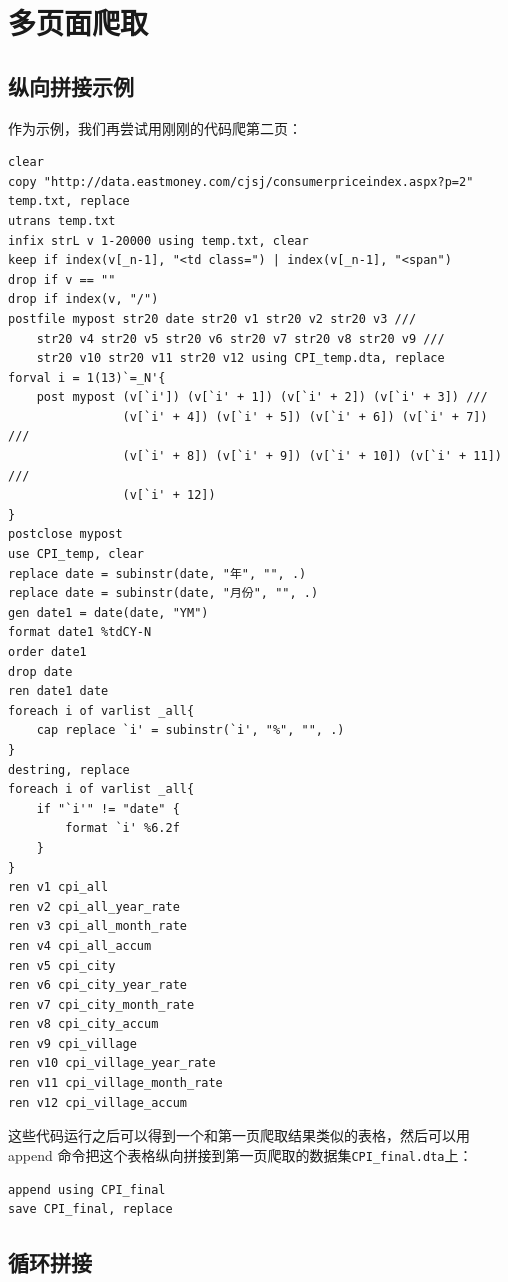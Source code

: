 \documentclass[cn,fancy,blue,11pt]{elegantbook}
\begin{document}
\hypertarget{section-36}{%
\section{多页面爬取}\label{section-36}}

\hypertarget{section-37}{%
\subsection{纵向拼接示例}\label{section-37}}

作为示例，我们再尝试用刚刚的代码爬第二页：

\begin{lstlisting}
clear
copy "http://data.eastmoney.com/cjsj/consumerpriceindex.aspx?p=2" temp.txt, replace
utrans temp.txt
infix strL v 1-20000 using temp.txt, clear
keep if index(v[_n-1], "<td class=") | index(v[_n-1], "<span")
drop if v == ""
drop if index(v, "/")
postfile mypost str20 date str20 v1 str20 v2 str20 v3 ///
    str20 v4 str20 v5 str20 v6 str20 v7 str20 v8 str20 v9 ///
    str20 v10 str20 v11 str20 v12 using CPI_temp.dta, replace
forval i = 1(13)`=_N'{
    post mypost (v[`i']) (v[`i' + 1]) (v[`i' + 2]) (v[`i' + 3]) ///
                (v[`i' + 4]) (v[`i' + 5]) (v[`i' + 6]) (v[`i' + 7]) ///
                (v[`i' + 8]) (v[`i' + 9]) (v[`i' + 10]) (v[`i' + 11]) ///
                (v[`i' + 12])
}
postclose mypost
use CPI_temp, clear
replace date = subinstr(date, "年", "", .)
replace date = subinstr(date, "月份", "", .)
gen date1 = date(date, "YM")
format date1 %tdCY-N
order date1
drop date
ren date1 date
foreach i of varlist _all{
    cap replace `i' = subinstr(`i', "%", "", .)
}
destring, replace
foreach i of varlist _all{
    if "`i'" != "date" {
        format `i' %6.2f
    }
}
ren v1 cpi_all
ren v2 cpi_all_year_rate
ren v3 cpi_all_month_rate
ren v4 cpi_all_accum
ren v5 cpi_city
ren v6 cpi_city_year_rate
ren v7 cpi_city_month_rate
ren v8 cpi_city_accum
ren v9 cpi_village
ren v10 cpi_village_year_rate
ren v11 cpi_village_month_rate
ren v12 cpi_village_accum
\end{lstlisting}

这些代码运行之后可以得到一个和第一页爬取结果类似的表格，然后可以用 append 命令把这个表格纵向拼接到第一页爬取的数据集\lstinline{CPI_final.dta}上：

\begin{lstlisting}
append using CPI_final
save CPI_final, replace
\end{lstlisting}

\hypertarget{section-38}{%
\subsection{循环拼接}\label{section-38}}
\end{document}
